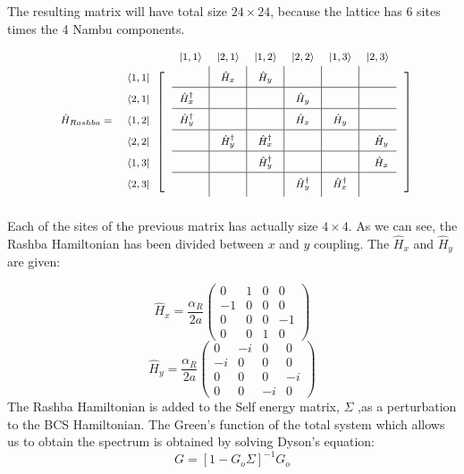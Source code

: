 \documentclass[letterpaper,12pt]{article}
\begin{document}
The resulting matrix will have total size $24 \times 24$, because the lattice has 6 sites times the 4 Nambu components.
\[
\renewcommand\arraystretch{1.75}
\footnotesize
\begin{blockarray}{rccccccccc}
&&& \ket{1, 1} & \ket{2, 1} & \ket{1, 2} & \ket{2, 2} & \ket{1, 3} & \ket{2, 3} &\\
\begin{block}{rc[c@{}c|c|c|c|c|c@{}c]}
  & \bra{1, 1} &&  & \hat{H}_x & \hat{H}_y &  &  & &\vphantom{\smash[b]{\bigg|}} \\
\BAhhline{~~~------~}
  & \bra{2,1} && \hat{H}_x^\dagger &  & & \hat{H}_y  &  & &\\
\BAhhline{~~~------~}
\hat{H}_{Rashba}=\quad
 & \bra{1,2} &&  \hat{H}_y^\dagger  &  &  &  \hat{H}_x &  \hat{H}_y  & &\\
\BAhhline{~~~------~}
  & \bra{2,2} &&  &  \hat{H}_y^\dagger  &  \hat{H}_x^\dagger  &  &   & \hat{H}_y \\
\BAhhline{~~~------~}
 & \bra{1,3} &&  &  &  \hat{H}_y^\dagger &  &  &  \hat{H}_x &\\
 \BAhhline{~~~------~}
  & \bra{2,3} &&  &  &  & \hat{H}_y^\dagger & \hat{H}_x^\dagger  & \vphantom{\smash[t]{\bigg|}} &\\
\end{block}
\end{blockarray}
\]
Each of the sites of the previous matrix has actually size $4\times 4$. As we can see, the Rashba Hamiltonian has been divided between $x$ and $y$ coupling. The $\hat{H}_x$ and $\hat{H}_y$ are given:


\begin{equation}
\hat{H}_x = 
    \frac{\alpha_R}{2a}\begin{pmatrix}
    0 & 1 & 0 & 0 \\
    -1 & 0 & 0 & 0 \\
    0 & 0 & 0 & -1 \\
    0 & 0 & 1 & 0
  \end{pmatrix}
\end{equation}
\vspace{0.5cm}
\begin{equation}
\hat{H}_y = 
    \frac{\alpha_R}{2a}\begin{pmatrix}
    0 & -i & 0 & 0 \\
    -i & 0 & 0 & 0 \\
    0 & 0 & 0 & -i \\
    0 & 0 & -i & 0
  \end{pmatrix}
\end{equation}
The Rashba Hamiltonian is added to the Self energy matrix, $\Sigma$ ,as a perturbation to the BCS Hamiltonian. The Green's function of the total system which allows us to obtain the spectrum is obtained by solving Dyson's equation:
\begin{equation}
    G = [1 - G_o\Sigma]^{-1}G_o
\end{equation}
\end{document}
